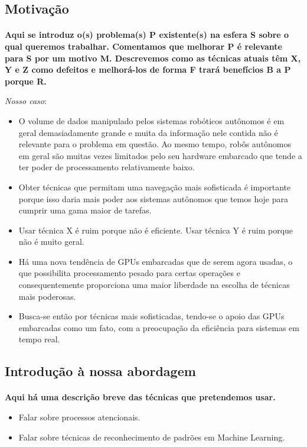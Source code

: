 \documentclass[11pt]{article}
\newcommand{\tit}[1]{\textit{#1}}
\newcommand{\tbf}[1]{\textbf{#1}}
\begin{document}
\subsection{Motivação}
\paragraph{}
\tbf{Aqui se introduz o(s) problema(s) P existente(s) na esfera S sobre o qual 
queremos trabalhar. 
Comentamos que melhorar P é relevante para S por um motivo M.
Descrevemos como as técnicas atuais têm X, Y e Z como defeitos e
melhorá-los de forma F trará benefícios B a P porque R.}

\tit{Nosso caso}:
\begin{itemize}
	\item O volume de dados manipulado pelos sistemas robóticos autônomos é
		em geral demasiadamente grande e muita da informação nele contida
		não é relevante para o problema em questão. Ao mesmo tempo, robôs
		autônomos em geral são muitas vezes limitados pelo seu hardware 
		embarcado que tende a ter poder de processamento relativamente baixo.
	\item Obter técnicas que permitam uma navegação mais sofisticada
		é importante porque isso daria mais poder aos sistemas 
		autônomos que temos hoje para cumprir uma gama maior de tarefas.
	\item Usar técnica X é ruim porque não é eficiente. Usar técnica Y é
		ruim porque não é muito geral.
	\item Há uma nova tendência de GPUs embarcadas que de serem agora usadas, 
		o que possibilita processamento pesado para certas operações e 
		consequentemente proporciona uma maior liberdade na escolha de técnicas
		mais poderosas.
	\item Busca-se então por técnicas mais sofisticadas, tendo-se o apoio das
		GPUs embarcadas como um fato, com a preocupação da eficiência para
		sistemas em tempo real.
\end{itemize}

\subsection{Introdução à nossa abordagem}
\paragraph{}
\tbf{Aqui há uma descrição breve das técnicas que pretendemos usar.}
\begin{itemize}
	\item Falar sobre processos atencionais.
	\item Falar sobre técnicas de reconhecimento de padrões em Machine Learning.
\end{itemize}
\end{document}
